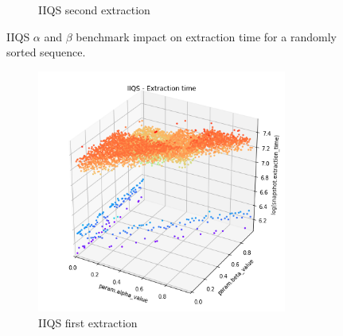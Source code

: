 \begin{figure}
\begin{subfigure}[b]{0.45\textwidth}
        \caption{IIQS second extraction}
        \label{FIG:05_ALPHABETA_RELATIONSHIP_RANDOM__0_1}
    \end{subfigure}

    \caption{IIQS $\alpha$ and $\beta$ benchmark impact on extraction time for a randomly sorted sequence.}
    \label{FIG:05_ALPHABETA_RELATIONSHIP_RANDOM}
\end{figure}

\begin{figure}
    \centering
    \begin{subfigure}[b]{0.45\textwidth}
        \centering
        \includegraphics[width=0.9\textwidth]{./fragments/04_experimental_execution/images/04_alphabeta_noclass_asc.png.1_0.png}
        \caption{IIQS first extraction}
        \label{FIG:05_ALPHABETA_RELATIONSHIP_ASC__0_0}
    \end{subfigure}
    \hfill
    \begin{subfigure}[b]{0.45\textwidth}
        \centering

\end{subfigure}
\end{figure}
